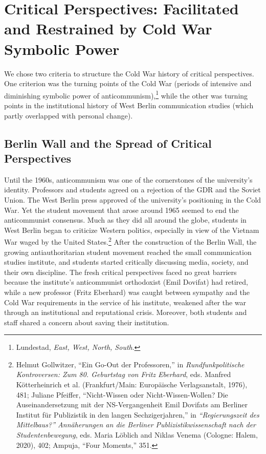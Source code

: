 \documentclass{tufte-handout}
\begin{document}
\hypertarget{critical-perspectives-facilitated-and-restrained-by-cold-war-symbolic-power}{%
\section{Critical Perspectives: Facilitated and Restrained by Cold
War\\\noindent Symbolic
Power}\label{critical-perspectives-facilitated-and-restrained-by-cold-war-symbolic-power}}

We chose two criteria to structure the Cold War history of critical
perspectives. One criterion was the turning points of the Cold War
(periods of intensive and diminishing symbolic power of
anticommunism),\footnote{Lundestad, \emph{East, West, North, South}.}
while the other was turning points in the institutional history of West
Berlin communication studies (which partly overlapped with personal
change).

\hypertarget{berlin-wall-and-the-spread-of-critical-perspectives}{%
\subsection{Berlin Wall and the Spread of
Critical
Perspectives}\label{berlin-wall-and-the-spread-of-critical-perspectives}}

Until the 1960s, anticommunism was one of the cornerstones of the
university's identity. Professors and students agreed on a rejection of
the GDR and the Soviet Union. The West Berlin press approved of the
university's positioning in the Cold War. Yet the student movement that
arose around 1965 seemed to end the anticommunist consensus. Much as
they did all around the globe, students in West Berlin began to
criticize Western politics, especially in view of the Vietnam War waged
by the United States.\footnote{Helmut Gollwitzer, ``Ein Go-Out der
  Professoren,'' in \emph{Rundfunkpolitische Kontroversen: Zum 80.
  Geburtstag von Fritz Eberhard}, eds. Manfred Kötterheinrich et al.
  (Frankfurt/Main: Europäische Verlagsanstalt, 1976), 481; Juliane
  Pfeiffer, ``Nicht-Wissen oder Nicht-Wissen-Wollen? Die
  Auseinandersetzung mit der NS-Vergangenheit Emil Dovifats am Berliner
  Institut für Publizistik in den langen Sechzigerjahren,'' in
  \emph{``Regierungszeit des Mittelbaus?'' Annäherungen an die Berliner
  Publizistikwissenschaft nach der Studentenbewegung}, eds. Maria
  Löblich and Niklas Venema (Cologne: Halem, 2020), 402; Ampuja, ``Four
  Moments,'' 351.} After the construction of the Berlin Wall, the
growing antiauthoritarian student movement reached the small
communication studies institute, and students started critically
discussing media, society, and their own discipline. The fresh critical
perspectives faced no great barriers because the institute's
anticommunist orthodoxist (Emil Dovifat) had retired, while a new
professor (Fritz Eberhard) was caught between sympathy and the Cold War
requirements in the service of his institute, weakened after the war
through an institutional and reputational crisis. Moreover, both
students and staff shared a concern about saving their institution.
\end{document}
